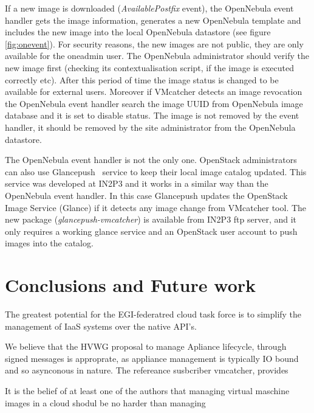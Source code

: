 \documentclass{llncs_Ibergrid2013}
\begin{document}
If a new image is downloaded (\textit{AvailablePostfix} event), the OpenNebula event handler gets the image information, generates a new OpenNebula template and includes the new image into the local OpenNebula datastore (see figure \ref{fig:onevent}). 
For security reasons, the new images are not public, they are only available for the oneadmin user. The OpenNebula administrator should verify the new image first (checking its contextualisation script, if the image is executed correctly etc).
After this period of time the image status is changed to be available for external users. 
Moreover if VMcatcher detects an image revocation the OpenNebula event handler search the image UUID from OpenNebula image database and it is set to disable status.
The image is not removed by the event handler, it should be removed by the site administrator from the OpenNebula datastore.

The OpenNebula event handler is not the only one. OpenStack administrators can also use Glancepush~\cite{glancepush} service to keep their local image catalog updated. 
This service was developed at IN2P3 and it works in a similar way than the OpenNebula event handler. 
In this case Glancepush updates the OpenStack Image Service (Glance) if it detects any image change from VMcatcher tool. 
The new package (\textit{glancepush-vmcatcher}) is available from IN2P3 ftp server, and it only requires a working glance service and an OpenStack user account to push images into the catalog.


\section{Conclusions and Future work}
\label{sect-conclusions}
The greatest potential for the EGI-federatred cloud task force is to simplify the management of IaaS systems over the native API's.


We believe that the HVWG proposal to manage Apliance lifecycle, through signed messages is approprate, as appliance management is typically IO bound and so asynconous in nature. The refereance susbcriber vmcatcher, provides 

It is the belief of at least one  of the authors that managing virtual maschine images in a cloud shodul be no harder than managing 
\end{document}
